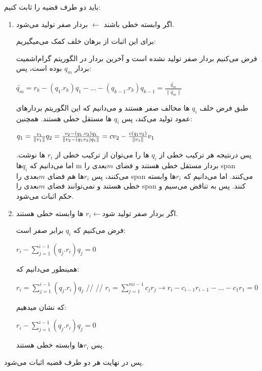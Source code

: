 باید دو طرف قضیه را ثابت کنیم:

\begin{enumerate}
	\item  	اگر وابسته خطی باشند $\longleftarrow$ بردار صفر تولید می‌شود. 
	
	برای این اثبات از برهان خلف کمک می‌میگیریم:
	
	فرض می‌کنیم بردار صفر تولید نشده است و آخرین بردار در الگوریتم گرام‌اشمیت بردار 
	$q_m$
	بوده است، پس:
	\setLTR
	
	$\widetilde{q_m} = r_k - (q_1.r_k)q_1 - ... - (q_{k-1}.r_k)q_{k-1}=\frac{\widetilde{q_m}}{\|\widetilde{q_m}\|}$
	
	\setRTL
	
	طبق فرض خلف
	$q_i$
	ها مخالف صفر هستند و می‌دانیم که این الگوریتم بردارهای عمود تولید می‌کند، پس 
	$q_i$
	ها مستقل‌ خطی هستند. همچنین:
	
	\setLTR
	
	$q_1 = \frac{v_1}{\|v_1\|} \\ q_2 = \frac{v_2 - (q_1.v_2)q_1}{\|v_2 - (q_1v_2)q_1\|} = cv_2 - \frac{c(q_1v_2)}{\|v_1\|}v_1$
	
	\setRTL
	
	پس درنتیجه هر ترکیب خطی از 
	$q_i$
	ها را می‌توان از ترکیب خطی از 
	$r_i$
	ها نوشت. اما می‌دانیم که $q_i$ها m بردار مستقل خطی هستند و فضای $m$بعدی را span می‌کنند، پس $r_i$ها هم فضای $m$بعدی را span می‌کنند.
	اما می‌دانیم که $r_i$ها وابسته خطی هستند و نمی‌توانند فضای $m$بعدی را span کنند. پس به تناقض می‌سیم و حکم اثبات می‌شود. \\
	
	
	
	\item 	اگر بردار صفر تولید شود$r_i \longleftarrow$ ها وابسته خطی هستند.
	
	فرض می‌کنیم که $q_i$ برابر صفر است:
	
	\setLTR
	
	$r_i - \sum_{j=1}^{i-1}(q_j.r_i)q_j = 0$
	
	\setRTL
	
	همینطور می‌دانیم که:
	
		\setLTR
	
	$r_i = \sum_{j=1}^{i-1}(q_j.r_i)q_j$ // //
	$r_i = \sum_{j=1}^{mi-1}c_jr_j \longrightarrow r_i - c_{i-1}r_{i-1} - ... - c_1r_1 = 0$
	\setRTL
	
	که نشان میدهیم:	\setLTR
	
	$r_i - \sum_{j=1}^{i-1}(q_j.r_i)q_j = 0$
	
	\setRTL
	
	پس $r_i$ها وابسته خطی هستند.
	
	\end{enumerate}
	
	پس در نهایت هر دو طرف قضیه اثبات می‌شود.